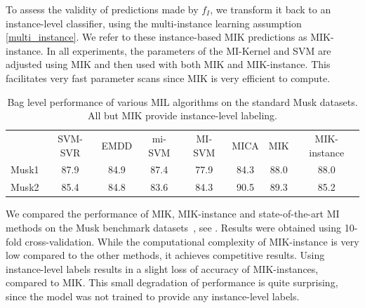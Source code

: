 To assess the validity of predictions made by $f_{I}$, we transform it
back to an instance-level classifier, using the multi-instance learning
assumption \eqref{multi_instance}. We refer to these instance-based MIK predictions
as MIK-instance. In all experiments, the parameters of the MI-Kernel
and SVM are adjusted using MIK and then used with both MIK and MIK-instance.
This facilitates very fast parameter scans since MIK is very efficient to
compute.

\begin{table}
    \centering
    \vspace{-4mm}
    \begin{tabularx}{0.9\linewidth}{@{\extracolsep{\fill}}lccccccc}
    \toprule
        & SVM-SVR & EMDD & mi-SVM & MI-SVM & MICA & MIK & MIK-instance \\
    \cmidrule(rl){2-8}
    Musk1 & 87.9 &84.9 &  87.4 &  77.9     & 84.3 & 88.0& 88.0 \\
    Musk2 & 85.4 &84.8 &  83.6 &  84.3     & 90.5 & 89.3& 85.2 \\
    \bottomrule
    \end{tabularx}
    \vspace{1mm}
    \caption{Bag level performance of various MIL algorithms on the standard Musk
    datasets. All but MIK provide instance-level labeling. }
    \vspace{-8mm}
\end{table}
We compared the performance of MIK, MIK-instance and state-of-the-art MI
methods on the Musk benchmark datasets~\cite{dietterich1997solving}, see
. Results were obtained using 10-fold
cross-validation. While the computational complexity of MIK-instance is
very low compared to the other methods, it achieves competitive results.
Using instance-level labels results in a slight loss of accuracy of
MIK-instances, compared to MIK\@. This small degradation of performance is quite surprising, since the model was
not trained to provide any instance-level labels.

